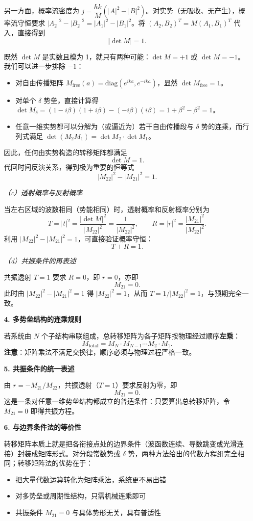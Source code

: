 另一方面，概率流密度为 $j = \dfrac{\hbar k}{M}(|A|^2 - |B|^2)$。对实势（无吸收、无产生），概率流守恒要求 $|A_2|^2 - |B_2|^2 = |A_1|^2 - |B_1|^2$。将 $(A_2,B_2)^T = M(A_1,B_1)^T$ 代入，直接得到
\[
|\det M| = 1.
\]

既然 $\det M$ 是实数且模为 1，就只有两种可能：$\det M = +1$ 或 $\det M = -1$。我们可以进一步排除 $-1$：
\begin{itemize}[nosep]
    \item 对自由传播矩阵 $M_{\text{free}}(a) = \text{diag}(e^{ika}, e^{-ika})$，显然 $\det M_{\text{free}} = 1$。
    \item 对单个 $\delta$ 势垒，直接计算得 $\det M_\delta = (1-i\beta)(1+i\beta) - (-i\beta)(i\beta) = 1+\beta^2 - \beta^2 = 1$。
    \item 任意一维实势都可以分解为（或逼近为）若干自由传播段与 $\delta$ 势的连乘，而行列式满足 $\det(M_2 M_1) = \det M_2 \cdot \det M_1$。
\end{itemize}
因此，任何由实势构造的转移矩阵都满足
\[
\boxed{\det M = 1}.
\]
代回时间反演关系，得到极为重要的恒等式
\[
\boxed{|M_{22}|^2 - |M_{21}|^2 = 1}.
\]

\textit{（c）透射概率与反射概率}

当左右区域的波数相同（势能相同）时，透射概率和反射概率分别为
\[
\boxed{T = |t|^2 = \frac{|\det M|^2}{|M_{22}|^2} = \frac{1}{|M_{22}|^2}},
\qquad
\boxed{R = |r|^2 = \frac{|M_{21}|^2}{|M_{22}|^2}}.
\]
利用 $|M_{22}|^2 - |M_{21}|^2 = 1$，可直接验证概率守恒：
\[
\boxed{T + R = 1}.
\]

\textit{（d）共振条件的再表述}

共振透射 $T=1$ 要求 $R=0$，即 $r=0$，亦即
\[
\boxed{M_{21} = 0}.
\]
此时由 $|M_{22}|^2 - |M_{21}|^2 = 1$ 得 $|M_{22}|^2=1$，从而 $T=1/|M_{22}|^2=1$，与预期完全一致。

\textbf{4. 多势垒结构的连乘规则}

若系统由 $N$ 个子结构串联组成，总转移矩阵为各子矩阵按物理经过顺序\textbf{左乘}：
\[
M_{\text{total}} = M_N \cdot M_{N-1} \cdots M_2 \cdot M_1.
\]
\textbf{注意}：矩阵乘法不满足交换律，顺序必须与物理过程严格一致。

\textbf{5. 共振条件的统一表述}

由 $r = -M_{21}/M_{22}$，共振透射（$T=1$）要求反射为零，即
\[
\boxed{M_{21} = 0}.
\]
这是一条对任意一维势垒结构都成立的普适条件：只要算出总转移矩阵，令 $M_{21}=0$ 即得共振方程。

\textbf{6. 与边界条件法的等价性}

转移矩阵本质上就是把各衔接点处的边界条件（波函数连续、导数跳变或光滑连接）封装成矩阵形式。对分段常数势或 $\delta$ 势，两种方法给出的代数方程组完全相同；转移矩阵法的优势在于：
\begin{itemize}[nosep]
    \item 把大量代数运算转化为矩阵乘法，系统更不易出错
    \item 对多势垒或周期性结构，只需机械连乘即可
    \item 共振条件 $M_{21}=0$ 与具体势形无关，具有普适性
\end{itemize}

